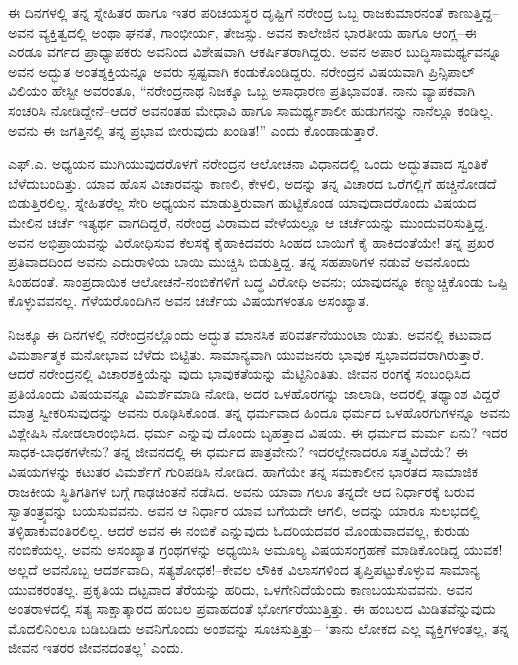 ಈ ದಿನಗಳಲ್ಲಿ ತನ್ನ ಸ್ನೇಹಿತರ ಹಾಗೂ ಇತರ ಪರಿಚಯಸ್ಥರ ದೃಷ್ಟಿಗೆ ನರೇಂದ್ರ ಒಬ್ಬ ರಾಜಕುಮಾರನಂತೆ ಕಾಣುತ್ತಿದ್ದ–ಅವನ ವ್ಯಕ್ತಿತ್ವದಲ್ಲಿ ಅಂಥಾ ಘನತೆ, ಗಾಂಭೀರ್ಯ, ತೇಜಸ್ಸು. ಅವನ ಕಾಲೇಜಿನ ಭಾರತೀಯ ಹಾಗೂ ಆಂಗ್ಲ–ಈ ಎರಡೂ ವರ್ಗದ ಪ್ರಾಧ್ಯಾಪಕರು ಅವನಿಂದ ವಿಶೇಷವಾಗಿ ಆಕರ್ಷಿತರಾಗಿದ್ದರು. ಅವನ ಅಪಾರ ಬುದ್ಧಿಸಾಮರ್ಥ್ಯವನ್ನೂ ಅವನ ಅದ್ಭುತ ಅಂತಶ್ಶಕ್ತಿಯನ್ನೂ ಅವರು ಸ್ಪಷ್ಟವಾಗಿ ಕಂಡುಕೊಂಡಿದ್ದರು. ನರೇಂದ್ರನ ವಿಷಯವಾಗಿ ಪ್ರಿನ್ಸಿಪಾಲ್ ವಿಲಿಯಂ ಹೇಸ್ಟೀ ಅವರಂತೂ, “ನರೇಂದ್ರನಾಥ ನಿಜಕ್ಕೂ ಒಬ್ಬ ಅಸಾಧಾರಣ ಪ್ರತಿಭಾವಂತ. ನಾನು ವ್ಯಾಪಕವಾಗಿ ಸಂಚರಿಸಿ ನೋಡಿದ್ದೇನೆ–ಆದರೆ ಅವನಂತಹ ಮೇಧಾವಿ ಹಾಗೂ ಸಾಮರ್ಥ್ಯಶಾಲೀ ಹುಡುಗನನ್ನು ನಾನೆಲ್ಲೂ ಕಂಡಿಲ್ಲ. ಅವನು ಈ ಜಗತ್ತಿನಲ್ಲಿ ತನ್ನ ಪ್ರಭಾವ ಬೀರುವುದು ಖಂಡಿತ!” ಎಂದು ಕೊಂಡಾಡುತ್ತಾರೆ.

ಎಫ್.ಎ. ಅಧ್ಯಯನ ಮುಗಿಯುವುದರೊಳಗೆ ನರೇಂದ್ರನ ಆಲೋಚನಾ ವಿಧಾನದಲ್ಲಿ ಒಂದು ಅದ್ಭುತವಾದ ಸ್ವಂತಿಕೆ ಬೆಳೆದುಬಂದಿತ್ತು. ಯಾವ ಹೊಸ ವಿಚಾರವನ್ನು ಕಾಣಲಿ, ಕೇಳಲಿ, ಅದನ್ನು ತನ್ನ ವಿಚಾರದ ಒರೆಗಲ್ಲಿಗೆ ಹಚ್ಚಿನೋಡದೆ ಬಿಡುತ್ತಿರಲಿಲ್ಲ. ಸ್ನೇಹಿತರೆಲ್ಲ ಸೇರಿ ಅಧ್ಯಯನ ಮಾಡುತ್ತಿರುವಾಗ ಹುಟ್ಟಿಕೊಂಡ ಯಾವುದಾದರೊಂದು ವಿಷಯದ ಮೇಲಿನ ಚರ್ಚೆ ಇತ್ಯರ್ಥ ವಾಗದಿದ್ದರೆ, ನರೇಂದ್ರ ವಿರಾಮದ ವೇಳೆಯಲ್ಲೂ ಆ ಚರ್ಚೆಯನ್ನು ಮುಂದುವರಿಸುತ್ತಿದ್ದ. ಅವನ ಅಭಿಪ್ರಾಯವನ್ನು ವಿರೋಧಿಸುವ ಕೆಲಸಕ್ಕೆ ಕೈಹಾಕಿದವರು ಸಿಂಹದ ಬಾಯಿಗೆ ಕೈ ಹಾಕಿದಂತೆಯೇ! ತನ್ನ ಪ್ರಖರ ಪ್ರತಿವಾದದಿಂದ ಅವನು ಎದುರಾಳಿಯ ಬಾಯಿ ಮುಚ್ಚಿಸಿ ಬಿಡುತ್ತಿದ್ದ. ತನ್ನ ಸಹಪಾಠಿಗಳ ನಡುವೆ ಅವನೊಂದು ಸಿಂಹದಂತೆ. ಸಾಂಪ್ರದಾಯಿಕ ಆಲೋಚನೆ-ನಂಬಿಕೆಗಳಿಗೆ ಬದ್ಧ ವಿರೋಧಿ ಅವನು; ಯಾವುದನ್ನೂ ಕಣ್ಮುಚ್ಚಿಕೊಂಡು ಒಪ್ಪಿ ಕೊಳ್ಳುವವನಲ್ಲ. ಗೆಳೆಯರೊಂದಿಗಿನ ಅವನ ಚರ್ಚೆಯ ವಿಷಯಗಳಂತೂ ಅಸಂಖ್ಯಾತ.

ನಿಜಕ್ಕೂ ಈ ದಿನಗಳಲ್ಲಿ ನರೇಂದ್ರನಲ್ಲೊಂದು ಅದ್ಭುತ ಮಾನಸಿಕ ಪರಿವರ್ತನೆಯುಂಟಾ ಯಿತು. ಅವನಲ್ಲಿ ಕಟುವಾದ ವಿಮರ್ಶಾತ್ಮಕ ಮನೋಭಾವ ಬೆಳೆದು ಬಿಟ್ಟಿತು. ಸಾಮಾನ್ಯವಾಗಿ ಯುವಜನರು ಭಾವುಕ ಸ್ವಭಾವದವರಾಗಿರುತ್ತಾರೆ. ಆದರೆ ನರೇಂದ್ರನಲ್ಲಿ ವಿಚಾರಶಕ್ತಿಯೆನ್ನು ವುದು ಭಾವುಕತೆಯನ್ನು ಮೆಟ್ಟಿನಿಂತಿತು. ಜೀವನ ರಂಗಕ್ಕೆ ಸಂಬಂಧಿಸಿದ ಪ್ರತಿಯೊಂದು ವಿಷಯವನ್ನೂ ವಿಮರ್ಶೆಮಾಡಿ ನೋಡಿ, ಅದರ ಒಳಹೊರಗನ್ನು ಜಾಲಾಡಿ, ಅದರಲ್ಲಿ ತಥ್ಯಾಂಶ ವಿದ್ದರೆ ಮಾತ್ರ ಸ್ವೀಕರಿಸುವುದನ್ನು ಅವನು ರೂಢಿಸಿಕೊಂಡ. ತನ್ನ ಧರ್ಮವಾದ ಹಿಂದೂ ಧರ್ಮದ ಒಳಹೊರಗುಗಳನ್ನೂ ಅವನು ವಿಶ್ಲೇಷಿಸಿ ನೋಡಲಾರಂಭಿಸಿದ. ಧರ್ಮ ಎನ್ನುವು ದೊಂದು ಬೃಹತ್ತಾದ ವಿಷಯ. ಈ ಧರ್ಮದ ಮರ್ಮ ಏನು? ಇದರ ಸಾಧಕ-ಬಾಧಕಗಳೇನು? ತನ್ನ ಜೀವನದಲ್ಲಿ ಈ ಧರ್ಮದ ಪಾತ್ರವೇನು? ಇದರಲ್ಲೇನಾದರೂ ಸತ್ತ್ವವಿದೆಯೆ? ಈ ವಿಷಯಗಳನ್ನು ಕಟುತರ ವಿಮರ್ಶೆಗೆ ಗುರಿಪಡಿಸಿ ನೋಡಿದ. ಹಾಗೆಯೇ ತನ್ನ ಸಮಕಾಲೀನ ಭಾರತದ ಸಾಮಾಜಿಕ ರಾಜಕೀಯ ಸ್ಥಿತಿಗತಿಗಳ ಬಗ್ಗೆ ಗಾಢಚಿಂತನೆ ನಡೆಸಿದ. ಅವನು ಯಾವಾ ಗಲೂ ತನ್ನದೇ ಆದ ನಿರ್ಧಾರಕ್ಕೆ ಬರುವ ಸ್ವಾತಂತ್ರ್ಯವನ್ನು ಬಯಸುವವನು. ಅವನ ಆ ನಿರ್ಧಾರ ಯಾವ ಬಗೆಯದೇ ಆಗಲಿ, ಅದನ್ನು ಯಾರೂ ಸುಲಭದಲ್ಲಿ ತಳ್ಳಿಹಾಕುವಂತಿರಲಿಲ್ಲ. ಆದರೆ ಅವನ ಈ ನಂಬಿಕೆ ಎನ್ನುವುದು ಓದರಿಯದವರ ಮೊಂಡುವಾದವಲ್ಲ, ಕುರುಡು ನಂಬಿಕೆಯಲ್ಲ. ಅವನು ಅಸಂಖ್ಯಾತ ಗ್ರಂಥಗಳನ್ನು ಅಧ್ಯಯಿಸಿ ಅಮೂಲ್ಯ ವಿಷಯಸಂಗ್ರಹಣೆ ಮಾಡಿಕೊಂಡಿದ್ದ ಯುವಕ! ಅಲ್ಲದೆ ಅವನೊಬ್ಬ ಆದರ್ಶವಾದಿ, ಸತ್ಯಶೋಧಕ!–ಕೇವಲ ಲೌಕಿಕ ವಿಲಾಸಗಳಿಂದ ತೃಪ್ತಿಪಟ್ಟುಕೊಳ್ಳುವ ಸಾಮಾನ್ಯ ಯುವಕರಂತಲ್ಲ. ಪ್ರಕೃತಿಯ ದಟ್ಟವಾದ ತೆರೆಯನ್ನು ಹರಿದು, ಒಳಗೇನಿದೆಯೆಂದು ಕಾಣಬಯಸುವವನು. ಅವನ ಅಂತರಾಳದಲ್ಲಿ ಸತ್ಯ ಸಾಕ್ಷಾತ್ಕಾರದ ಹಂಬಲ ಪ್ರವಾಹದಂತೆ ಭೋರ್ಗರೆಯುತ್ತಿತ್ತು. ಈ ಹಂಬಲದ ಮಿಡಿತವೆನ್ನುವುದು ಮೊದಲಿನಿಂಲೂ ಬಡಿಬಡಿದು ಅವನಿಗೊಂದು ಅಂಶವನ್ನು ಸೂಚಿಸುತ್ತಿತ್ತು– ‘ತಾನು ಲೋಕದ ಎಲ್ಲ ವ್ಯಕ್ತಿಗಳಂತಲ್ಲ, ತನ್ನ ಜೀವನ ಇತರರ ಜೀವನದಂತಲ್ಲ’ ಎಂದು.

